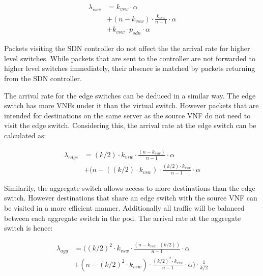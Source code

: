 \begin{equation}
\label{eq:arr_srv}
\begin{split}
\lambda_{vsw} &= k_{vsw} \cdot \alpha \\
			  &+ (n - k_{vsw}) \cdot  \frac{k_{vsw}}{n - 1} \cdot \alpha \\
			  &+ k_{vsw} \cdot p_{sdn} \cdot \alpha
\end{split}
\end{equation}

Packets visiting the SDN controller do not affect the the arrival rate for higher level switches. While packets that are sent to the controller are not forwarded to higher level switches immediately, their absence is matched by packets returning from the SDN controller.

The arrival rate for the edge switches can be deduced in a similar way. The edge switch has more VNFs under it than the virtual switch. However packets that are intended for destinations on the same server as the source VNF do not need to visit the edge switch. Considering this, the arrival rate at the edge switch can be calculated as:

\begin{equation}
\label{eq:arr_edge}
\begin{split}
\lambda_{edge} &= (k/2) \cdot k_{vsw} \cdot \frac{(n - k_{vsw})}{n - 1} \cdot \alpha \\
			   &+ (n - ((k/2) \cdot k_{vsw}) \cdot \frac{(k/2) \cdot k_{vsw}}{n - 1} \cdot \alpha 
\end{split}
\end{equation}

Similarily, the aggregate switch allows access to more destinations than the edge switch. However destinations that share an edge switch with the source VNF can be visited in a more efficient manner. Additionally all traffic will be balanced between each aggregate switch in the pod. The arrival rate at the aggregate switch is hence:

\begin{equation}
\label{eq:arr_agg}
\begin{split}
\lambda_{agg} &= \Big((k/2)^2 \cdot k_{vsw} \cdot \frac{(n - k_{vsw} \cdot (k/2))}{n - 1} \cdot \alpha\\
			  &+ (n - (k/2)^2 \cdot k_{vsw}) \cdot \frac{(k/2)^2 \cdot k_{vsw}}{n - 1} \cdot \alpha\Big) \cdot \frac{1}{k/2}
\end{split}
\end{equation}

